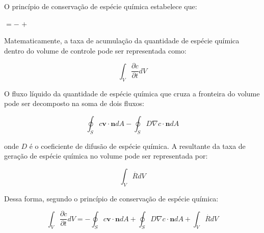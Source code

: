 O princípio de conservação de espécie química estabelece que:

\medskip
\begin{center}
           $= -$ 
           $+$ 
\end{center}

\medskip
Matematicamente, a taxa de acumulação da quantidade de espécie química
dentro do volume de controle pode ser representada como:

\begin{equation} \label{esp 1} 
 \int_{V} \frac{\partial c}{\partial t} dV
\end{equation}

\medskip
O fluxo líquido da quantidade de espécie
química que cruza a fronteira do volume pode ser
decomposto na soma de dois fluxos:

\begin{equation}  
 \oint_{S} c \textbf{v} \cdot \textbf{n} dA
 -
 \oint_{S} D \nabla c \cdot \textbf{n} dA
\end{equation}

\medskip
\noindent
onde $D$ é o coeficiente de difusão de espécie química.
A resultante da taxa de geração de espécie química
no volume pode ser representada por:

\begin{equation} 
 \int_{V} \overset{.}{R} dV
\end{equation}

\medskip
\noindent
Dessa forma, segundo o princípio de conservação de espécie
química:

\begin{equation}
 \int_{V} \frac{\partial c}{\partial t} dV
 = 
 - 
 \oint_{S} c \textbf{v} \cdot \textbf{n} dA
 +
 \oint_{S} D \nabla c \cdot \textbf{n} dA
 +
 \int_{V} \overset{.}{R} dV
\end{equation}


